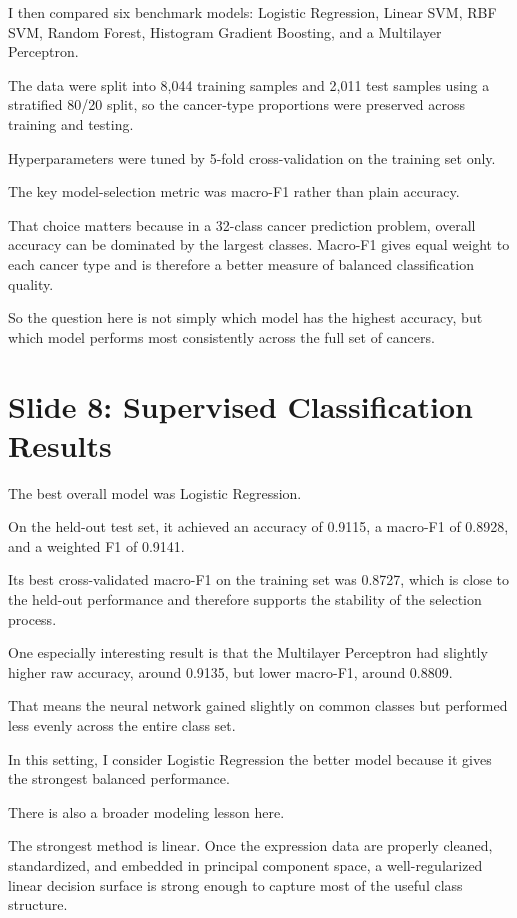 \documentclass[12pt]{article}
\begin{document}
I then compared six benchmark models: Logistic Regression, Linear SVM, RBF SVM, Random Forest, Histogram Gradient Boosting, and a Multilayer Perceptron.

The data were split into 8,044 training samples and 2,011 test samples using a stratified 80/20 split, so the cancer-type proportions were preserved across training and testing.

Hyperparameters were tuned by 5-fold cross-validation on the training set only.

The key model-selection metric was macro-F1 rather than plain accuracy.

That choice matters because in a 32-class cancer prediction problem, overall accuracy can be dominated by the largest classes. Macro-F1 gives equal weight to each cancer type and is therefore a better measure of balanced classification quality.

So the question here is not simply which model has the highest accuracy, but which model performs most consistently across the full set of cancers.

\section{Slide 8: Supervised Classification Results}
The best overall model was Logistic Regression.

On the held-out test set, it achieved an accuracy of 0.9115, a macro-F1 of 0.8928, and a weighted F1 of 0.9141.

Its best cross-validated macro-F1 on the training set was 0.8727, which is close to the held-out performance and therefore supports the stability of the selection process.

One especially interesting result is that the Multilayer Perceptron had slightly higher raw accuracy, around 0.9135, but lower macro-F1, around 0.8809.

That means the neural network gained slightly on common classes but performed less evenly across the entire class set.

In this setting, I consider Logistic Regression the better model because it gives the strongest balanced performance.

There is also a broader modeling lesson here.

The strongest method is linear. Once the expression data are properly cleaned, standardized, and embedded in principal component space, a well-regularized linear decision surface is strong enough to capture most of the useful class structure.
\end{document}
